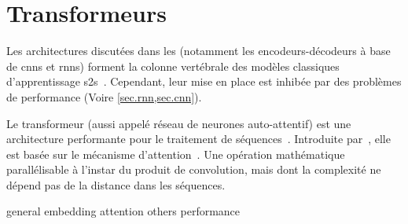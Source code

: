 \section{Transformeurs}

Les architectures discutées dans les 
(notamment les encodeurs-décodeurs à base de \glspl{cnn} et \glspl{rnn}) 
forment la colonne vertébrale des modèles classiques d'apprentissage \gls{s2s}~\cite{deep-nmt-survey}.
Cependant, leur mise en place est inhibée par des problèmes de performance 
(Voire \cref{sec.rnn,sec.cnn}).

Le transformeur (aussi appelé réseau de neurones auto-attentif) est une architecture performante pour le traitement de séquences~\cite{Shim_Sung_2022}.
Introduite par~\cite{attention}, elle est basée sur le mécanisme d'attention~\cite{Larochelle_Hinton_2010}.
Une opération mathématique parallélisable à l'instar du produit de convolution, 
mais dont la complexité ne dépend pas de la distance dans les séquences.



{general}
{embedding}
{attention}
{others}
{performance}